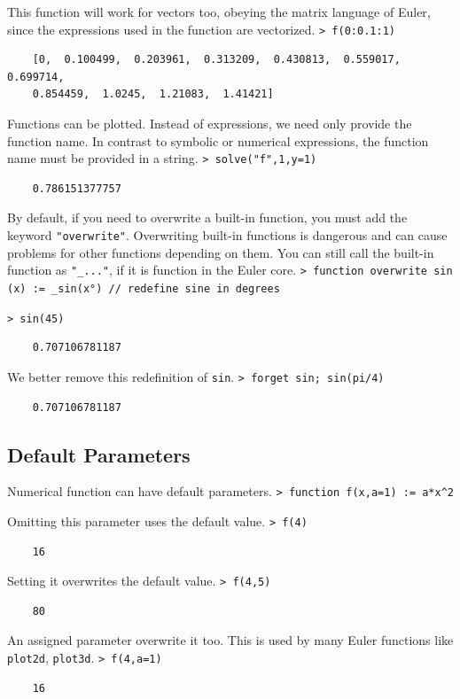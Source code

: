 \documentclass[11pt, a4paper]{article}
\newcommand{\emtcmd}[1]{\noindent\texttt{\textcolor{emtcommand}{>}\ #1}\par\smallskip}
\begin{document}
This function will work for vectors too, obeying the matrix language of Euler, since the expressions used in the function are vectorized.
\emtcmd{f(0:0.1:1)}
\begin{verbatim}
    [0,  0.100499,  0.203961,  0.313209,  0.430813,  0.559017,  0.699714,
    0.854459,  1.0245,  1.21083,  1.41421]
\end{verbatim}

Functions can be plotted. Instead of expressions, we need only provide the function name. In contrast to symbolic or numerical expressions, the function name must be provided in a string.
\emtcmd{solve("f",1,y=1)}
\begin{verbatim}
    0.786151377757
\end{verbatim}

By default, if you need to overwrite a built-in function, you must add the keyword \texttt{"overwrite"}. Overwriting built-in functions is dangerous and can cause problems for other functions depending on them. You can still call the built-in function as \texttt{"\_..."}, if it is function in the Euler core.
\emtcmd{function overwrite sin (x) := \_sin(x°) \textcolor{emtcomment}{// redefine sine in degrees}}
\emtcmd{sin(45)}
\begin{verbatim}
    0.707106781187
\end{verbatim}

We better remove this redefinition of \texttt{sin}.
\emtcmd{forget sin; sin(pi/4)}
\begin{verbatim}
    0.707106781187
\end{verbatim}

\subsection*{Default Parameters}

Numerical function can have default parameters.
\emtcmd{function f(x,a=1) := a*x\^{}2}

Omitting this parameter uses the default value.
\emtcmd{f(4)}
\begin{verbatim}
    16
\end{verbatim}

Setting it overwrites the default value.
\emtcmd{f(4,5)}
\begin{verbatim}
    80
\end{verbatim}

An assigned parameter overwrite it too. This is used by many Euler functions like \texttt{plot2d}, \texttt{plot3d}.
\emtcmd{f(4,a=1)}
\begin{verbatim}
    16
\end{verbatim}
\end{document}
